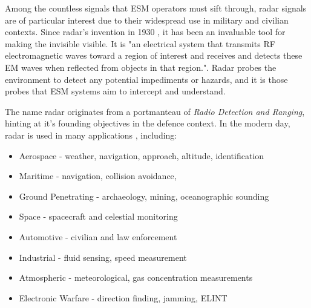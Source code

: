 Among the countless signals that \ac{ESM} operators must sift through, radar signals are of particular interest due to their widespread use in military and civilian contexts.
Since radar's invention in 1930 \cite{degering_invention_2018}, it has been an invaluable tool for making the invisible visible.
It is "an electrical system that transmits \ac{RF} electromagnetic waves toward a region of interest and receives and detects these EM waves when reflected from objects in that region."\cite{richards_principles_2010}.
Radar probes the environment to detect any potential impediments or hazards, and it is those probes that \ac{ESM} systems aim to intercept and understand.

The name radar originates from a portmanteau of \textit{Radio Detection and Ranging}\cite{the_joint_board_on_scientific_information_policy_radar_1945}, hinting at it's founding objectives in the defence context. In the modern day, radar is used in many applications \cite{merrill_i_skolnik_radar_nodate, desai_how_2022}, including:
\begin{itemize}
    \item Aerospace - weather, navigation, approach, altitude, identification
    \item Maritime - navigation, collision avoidance,  
    \item Ground Penetrating - archaeology, mining, oceanographic sounding
    \item Space - spacecraft and celestial monitoring
    \item Automotive - civilian and law enforcement
    \item Industrial - fluid sensing, speed measurement
    \item Atmospheric - meteorological, gas concentration measurements
    \item Electronic Warfare - direction finding, jamming, \ac{ELINT}
\end{itemize}

